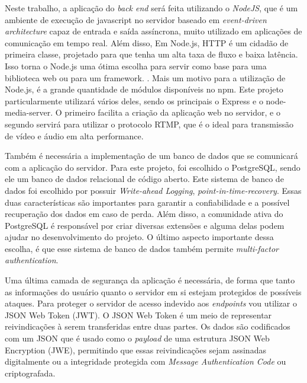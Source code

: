 \documentclass[12pt, %
openright, 
oneside, %
a4paper,    %
brazil]{facom-ufu-abntex2}
\begin{document}

Neste trabalho, a aplicação do \emph{back end} será feita utilizando o
\emph{NodeJS}, que é um ambiente de execução de javascript no servidor baseado
em \emph{event-driven architecture} capaz de entrada e saída assíncrona, muito
utilizado em aplicações de comunicação em tempo real. \cite{aboutnodejs} Além
disso, Em Node.js, HTTP é um cidadão de primeira classe, projetado para que
tenha um alta taxa de fluxo e baixa latência. Isso torna o Node.js uma ótima
escolha para servir como base para uma biblioteca web ou para um framework.
\cite{NodeJSaboutoriginal}. Mais um motivo para a utilização de Node.js, é a
grande quantidade de módulos disponíveis no npm. Este projeto particularmente
utilizará vários deles, sendo os principais o Express e o node-media-server. O
primeiro facilita a criação da aplicação web no servidor, e o segundo servirá
para utilizar o protocolo RTMP, que é o ideal para transmissão de vídeo e áudio
em alta performance.

Também é necessária a implementação de um banco de dados que se comunicará com
a aplicação do servidor. Para este projeto, foi escolhido o PostgreSQL, sendo
ele um banco de dados relacional de código aberto. Este sistema de banco de
dados foi escolhido por possuir \emph{Write-ahead Logging},
\emph{point-in-time-recovery}. Essas duas características são importantes para
garantir a confiabilidade e a possível recuperação dos dados em caso de perda.
Além disso, a comunidade ativa do PostgreSQL é responsável por criar diversas
extensões e alguma delas podem ajudar no desenvolvimento do projeto. O último
aspecto importante dessa escolha, é que esse sistema de banco de dados também
permite \emph{multi-factor authentication}. \cite{aboutPostgre}

Uma última camada de segurança da aplicação é necessária, de forma que tanto as
informações do usuário quanto o servidor em si estejam protegidos de possíveis
ataques. Para proteger o servidor de acesso indevido aos \emph{endpoints} vou
utilizar o JSON Web Token (JWT). O JSON Web Token é um meio de representar
reivindicações à serem transferidas entre duas partes. Os dados são codificados
com um JSON que é usado como o \emph{payload} de uma estrutura JSON Web
Encryption (JWE), permitindo que essas reivindicações sejam assinadas
digitalmente ou a integridade protegida com \emph{Message Authentication Code}
ou criptografada. \cite{jsonwebtoken}
\end{document}
